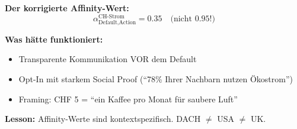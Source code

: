 \begin{tcolorbox}[colback=red!3!white, colframe=red!60!black,
    title=\textbf{Case Study 2: Der Stromversorger und die rebellischen Defaults}]
\textbf{Der korrigierte Affinity-Wert:}
\begin{equation*}
\alpha_{\text{Default}, \text{Action}}^{\text{CH-Strom}} = 0.35 \quad \text{(nicht 0.95!)}
\end{equation*}

\textbf{Was hätte funktioniert:}
\begin{itemize}[nosep]
    \item Transparente Kommunikation VOR dem Default
    \item Opt-In mit starkem Social Proof (``78\% Ihrer Nachbarn nutzen Ökostrom'')
    \item Framing: CHF 5 = ``ein Kaffee pro Monat für saubere Luft''
\end{itemize}

\textbf{Lesson:} \colorbox{yellow!30}{Affinity-Werte sind kontextspezifisch. DACH $\neq$ USA $\neq$ UK.}

\end{tcolorbox}

